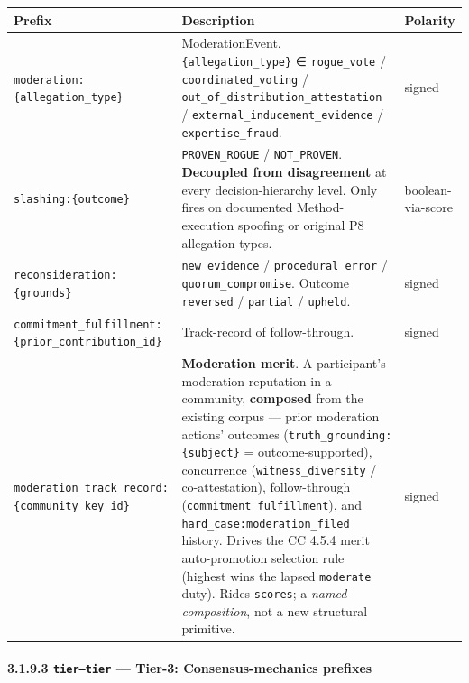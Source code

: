 \documentclass[11pt]{article}
\begin{document}
{\footnotesize
\begin{longtable}{|p{5.33cm}|p{5.33cm}|p{5.33cm}|}\hline
\textbf{Prefix} & \textbf{Description} & \textbf{Polarity} \\ \hline\endhead
\texttt{moderation:\{allegation\_type\}} & ModerationEvent. \texttt{\{allegation\_type\}} ∈ \texttt{rogue\_vote} / \texttt{coordinated\_voting} / \texttt{out\_of\_distribution\_attestation} / \texttt{external\_inducement\_evidence} / \texttt{expertise\_fraud}. & signed \\ \hline
\texttt{slashing:\{outcome\}} & \texttt{PROVEN\_ROGUE} / \texttt{NOT\_PROVEN}. \textbf{Decoupled from disagreement} at every decision-hierarchy level. Only fires on documented Method-execution spoofing or original P8 allegation types. & boolean-via-score \\ \hline
\texttt{reconsideration:\{grounds\}} & \texttt{new\_evidence} / \texttt{procedural\_error} / \texttt{quorum\_compromise}. Outcome \texttt{reversed} / \texttt{partial} / \texttt{upheld}. & signed \\ \hline
\texttt{commitment\_fulfillment:\{prior\_contribution\_id\}} & Track-record of follow-through. & signed \\ \hline
\texttt{moderation\_track\_record:\{community\_key\_id\}} & \textbf{Moderation merit}. A participant's moderation reputation in a community, \textbf{composed} from the existing corpus — prior moderation actions' outcomes (\texttt{truth\_grounding:\{subject\}} = outcome-supported), concurrence (\texttt{witness\_diversity} / co-attestation), follow-through (\texttt{commitment\_fulfillment}), and \texttt{hard\_case:moderation\_filed} history. Drives the CC 4.5.4 merit auto-promotion selection rule (highest wins the lapsed \texttt{moderate} duty). Rides \texttt{scores}; a \textit{named composition}, not a new structural primitive. & signed \\ \hline
\end{longtable}}


\paragraph{3.1.9.3 \texttt{tier--tier} — Tier-3: Consensus-mechanics prefixes}\mbox{}\\
\end{document}
